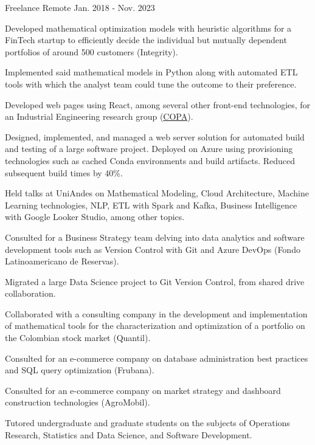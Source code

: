 \begin{cventries}
	{Freelance} %
	{Remote} %
	{Jan. 2018 {-} Nov. 2023} %
	{
		\begin{cvitems} %
			\item {Developed mathematical optimization models with heuristic algorithms for a FinTech startup to efficiently decide the individual but mutually dependent portfolios of around 500 customers (Integrity).}
			\item {Implemented said mathematical models in Python along with automated ETL tools with which the analyst team could tune the outcome to their preference.}
			\item {Developed  web pages using React, among several other front-end technologies, for an Industrial Engineering research group (\href{https://copa.uniandes.edu.co/en/}{COPA}).}
			\item {Designed, implemented, and managed a web server solution for automated build and testing of a large software project. Deployed on Azure using provisioning technologies such as cached Conda environments and build artifacts. Reduced subsequent build times by 40\%.}
			\item {Held talks at UniAndes on Mathematical Modeling, Cloud Architecture, Machine Learning technologies, NLP, ETL with Spark and Kafka, Business Intelligence with Google Looker Studio, among other topics.}
			\item {Consulted for a Business Strategy team delving into data analytics and software development tools such as Version Control with Git and Azure DevOps (Fondo Latinoamericano de Reservas).}
			\item {Migrated a large Data Science project to Git Version Control, from shared drive collaboration.}
			\item {Collaborated with a consulting company in the development and implementation of mathematical tools for the characterization and optimization of a portfolio on the Colombian stock market (Quantil).}
			\item {Consulted for an e-commerce company on database administration best practices and SQL query optimization (Frubana).}
			\item {Consulted for an e-commerce company on market strategy and dashboard construction technologies (AgroMobil).}
			\item {Tutored undergraduate and graduate students on the subjects of Operations Research, Statistics and Data Science, and Software Development.}
		\end{cvitems}
	}


\end{cventries}
